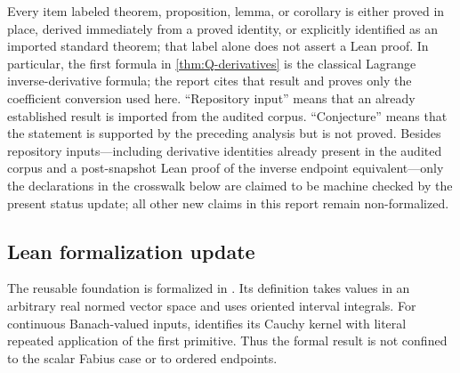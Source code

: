 \documentclass[11pt,oneside]{article}
\theoremstyle{definition}
\theoremstyle{remark}
\newcommand{\1}{\mathbf 1}
\begin{document}
\begin{statusbox}
Every item labeled theorem, proposition, lemma, or corollary is either proved
in place, derived immediately from a proved identity, or explicitly identified
as an imported standard theorem; that label alone does not assert a Lean
proof.  In particular, the first formula in \cref{thm:Q-derivatives} is the
classical Lagrange inverse-derivative formula; the report cites that result and
proves only the coefficient conversion used here.  ``Repository input'' means
that an already established result is imported from the audited corpus.
``Conjecture'' means that the statement is supported by the preceding analysis
but is not proved.  Besides repository inputs---including derivative identities
already present in the audited corpus and a post-snapshot Lean proof of the
inverse endpoint equivalent---only the declarations in the crosswalk below are
claimed to be machine checked by the present status update; all other new
claims in this report remain non-formalized.
\end{statusbox}

\subsection{Lean formalization update}
The reusable foundation is formalized in
.  Its definition
 takes values in an arbitrary real normed vector
space and uses oriented interval integrals.  For continuous Banach-valued
inputs,
 identifies its Cauchy
kernel with literal repeated application of the first primitive.  Thus the
formal result is not confined to the scalar Fabius case or to ordered
endpoints.
\end{document}
